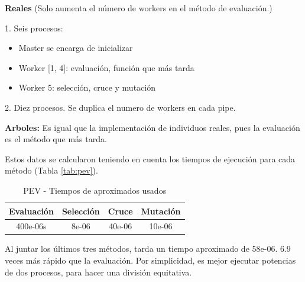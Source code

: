 		\begin{flushleft}
		\begin{mdframed}[roundcorner=5pt]					
			\normalsize		
			\textbf{Reales} \small (Solo aumenta el número de workers en el método de evaluación.)	
			
			
			\normalsize		
			\color{darkgreen} 1. Seis procesos: \color{black}
			\vspace{-0.3cm}
			\scriptsize
			\begin{itemize}			
				\item Master se encarga de inicializar
				\vspace{-0.1cm}
				\item Worker [1, 4]: evaluación, función que más tarda			
				\vspace{-0.1cm}
				\item Worker 5:  selección, cruce y mutación						
				\vspace{-0.1cm}
			\end{itemize}
			\small
			\color{blue} 2. Diez procesos. \color{black} \scriptsize Se duplica el numero de workers en cada pipe.
			
			\vspace{0.2cm}
			\normalsize
			\textbf{Arboles:} \small Es igual que la implementación de individuos reales, pues la evaluación es el método que más tarda.			
		\end{mdframed}
		\end{flushleft}



		Estos datos se calcularon teniendo en cuenta los tiempos de ejecución para cada método (Tabla \ref{tab:pev}).
		
		\begin{table}[!h]				
		\centering
		\begin{tabular}{|c|c|c|c|}
			\hline
			\rowcolor{lightgray}
			\textbf{Evaluación} & \textbf{Selección} & \textbf{Cruce} & \textbf{Mutación}\\
			\hline
			400e-06s  & 8e-06 & 40e-06 & 10e-06\\ 
			\hline
		\end{tabular}
		\caption{PEV - Tiempos de aproximados usados}
		\label{tab:tiempos_aprox}
		\end{table}
		
		
		Al juntar los últimos tres métodos, tarda un tiempo aproximado de 58e-06. 6.9 veces más rápido que la evaluación. Por simplicidad, es mejor ejecutar potencias de dos procesos, para hacer una división equitativa.
	
